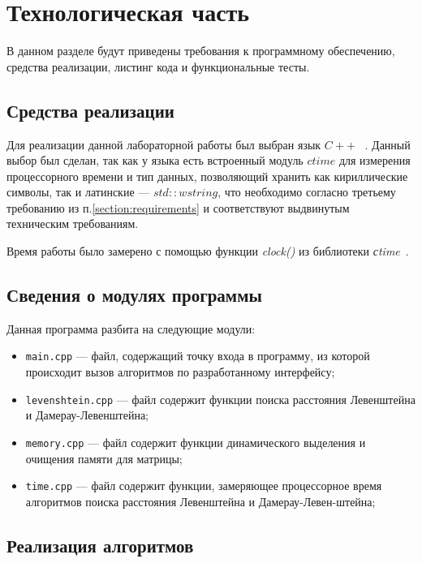 \chapter{Технологическая часть}

В данном разделе будут приведены требования к программному обеспечению, средства реализации, листинг кода и функциональные тесты.

\section{Средства реализации}

Для реализации данной лабораторной работы был выбран язык $C++$ ~\cite{cpp-lang}. Данный выбор был сделан, так как у языка есть встроенный модуль $ctime$ для измерения процессорного времени и тип данных, позволяющий хранить как кириллические символы, так и латинские --- $std::wstring$, что необходимо согласно третьему требованию из п.\ref{section:requirements} и соответствуют выдвинутым техническим требованиям.

Время работы было замерено с помощью функции \textit{clock()} из библиотеки \textit{сtime}~\cite{cpp-lang-time}.

\clearpage

\section{Сведения о модулях программы}

Данная программа разбита на следующие модули:

\begin{itemize}
	\item \texttt{main.cpp} --- файл, содержащий точку входа в программу, из которой происходит вызов алгоритмов по разработанному интерфейсу;
	\item \texttt{levenshtein.cpp} --- файл содержит функции поиска расстояния Левенштейна и Дамерау-Левенштейна;
	\item \texttt{memory.cpp} --- файл содержит функции динамического выделения и очищения памяти для матрицы;
	\item \texttt{time.cpp} --- файл содержит функции, замеряющее процессорное время алгоритмов поиска расстояния Левенштейна и Дамерау-Левен-штейна;
\end{itemize}

\section{Реализация алгоритмов}

